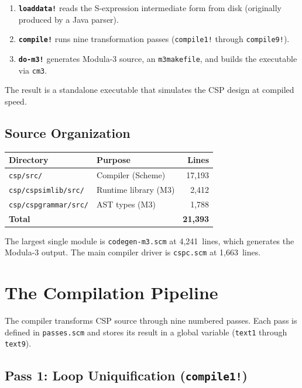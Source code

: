 \documentclass[11pt,letterpaper]{article}
\begin{document}
\begin{enumerate}[nosep]
  \item \textbf{\texttt{loaddata!}} reads the S-expression intermediate
    form from disk (originally produced by a Java parser).
  \item \textbf{\texttt{compile!}} runs nine transformation passes
    (\texttt{compile1!} through \texttt{compile9!}).
  \item \textbf{\texttt{do-m3!}} generates Modula-3 source, an
    \texttt{m3makefile}, and builds the executable via \texttt{cm3}.
\end{enumerate}

The result is a standalone executable that simulates the CSP design
at compiled speed.

\subsection{Source Organization}

\begin{center}
\begin{tabular}{llr}
\toprule
\textbf{Directory} & \textbf{Purpose} & \textbf{Lines} \\
\midrule
\texttt{csp/src/} & Compiler (Scheme) & 17,193 \\
\texttt{csp/cspsimlib/src/} & Runtime library (M3) & 2,412 \\
\texttt{csp/cspgrammar/src/} & AST types (M3) & 1,788 \\
\midrule
\textbf{Total} & & \textbf{21,393} \\
\bottomrule
\end{tabular}
\end{center}

The largest single module is \texttt{codegen-m3.scm} at 4,241~lines,
which generates the Modula-3 output.  The main compiler driver is
\texttt{cspc.scm} at 1,663~lines.


\section{The Compilation Pipeline}
\label{sec:pipeline}

The compiler transforms CSP source through nine numbered passes.
Each pass is defined in \texttt{passes.scm} and stores its result
in a global variable (\texttt{text1} through \texttt{text9}).

\subsection{Pass 1: Loop Uniquification (\texttt{compile1!})}
\end{document}
